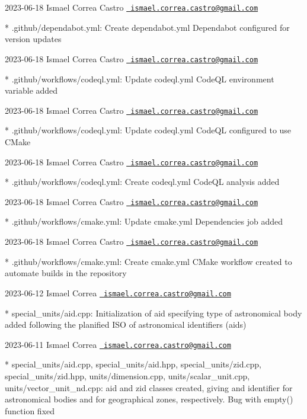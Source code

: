  2023-\/06-\/18 Ismael Correa Castro \href{mailto:ismael.correa.castro@gmail.com}{\texttt{ ismael.\+correa.\+castro@gmail.\+com}} \begin{DoxyVerb}* .github/dependabot.yml: Create dependabot.yml Dependabot configured for version updates
\end{DoxyVerb}
 2023-\/06-\/18 Ismael Correa Castro \href{mailto:ismael.correa.castro@gmail.com}{\texttt{ ismael.\+correa.\+castro@gmail.\+com}} \begin{DoxyVerb}* .github/workflows/codeql.yml: Update codeql.yml CodeQL environment variable added
\end{DoxyVerb}
 2023-\/06-\/18 Ismael Correa Castro \href{mailto:ismael.correa.castro@gmail.com}{\texttt{ ismael.\+correa.\+castro@gmail.\+com}} \begin{DoxyVerb}* .github/workflows/codeql.yml: Update codeql.yml CodeQL configured to use CMake
\end{DoxyVerb}
 2023-\/06-\/18 Ismael Correa Castro \href{mailto:ismael.correa.castro@gmail.com}{\texttt{ ismael.\+correa.\+castro@gmail.\+com}} \begin{DoxyVerb}* .github/workflows/codeql.yml: Create codeql.yml CodeQL analysis added
\end{DoxyVerb}
 2023-\/06-\/18 Ismael Correa Castro \href{mailto:ismael.correa.castro@gmail.com}{\texttt{ ismael.\+correa.\+castro@gmail.\+com}} \begin{DoxyVerb}* .github/workflows/cmake.yml: Update cmake.yml Dependencies job added
\end{DoxyVerb}
 2023-\/06-\/18 Ismael Correa Castro \href{mailto:ismael.correa.castro@gmail.com}{\texttt{ ismael.\+correa.\+castro@gmail.\+com}} \begin{DoxyVerb}* .github/workflows/cmake.yml: Create cmake.yml CMake workflow created to automate builds in the repository
\end{DoxyVerb}
 2023-\/06-\/12 Ismael Correa \href{mailto:ismael.correa.castro@gmail.com}{\texttt{ ismael.\+correa.\+castro@gmail.\+com}} \begin{DoxyVerb}* special_units/aid.cpp: Initialization of aid specifying type of
astronomical body added following the planified ISO of astronomical
identifiers (aids)
\end{DoxyVerb}
 2023-\/06-\/11 Ismael Correa \href{mailto:ismael.correa.castro@gmail.com}{\texttt{ ismael.\+correa.\+castro@gmail.\+com}} \begin{DoxyVerb}* special_units/aid.cpp, special_units/aid.hpp,
special_units/zid.cpp, special_units/zid.hpp, units/dimension.cpp,
units/scalar_unit.cpp, units/vector_unit_nd.cpp: aid and zid classes
created, giving and identifier for astronomical bodies and for
geographical zones, respectively. Bug with empty() function fixed
\end{DoxyVerb}
